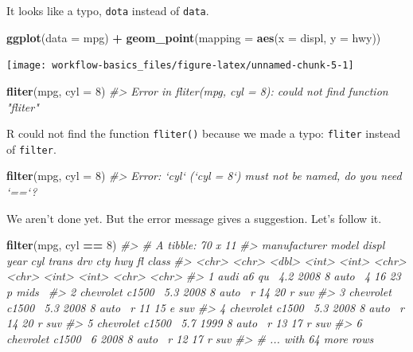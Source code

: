 \documentclass[]{book}
\newenvironment{Shaded}{\begin{snugshade}}{\end{snugshade}}
\newcommand{\CommentTok}[1]{\textcolor[rgb]{0.56,0.35,0.01}{\textit{#1}}}
\newcommand{\DataTypeTok}[1]{\textcolor[rgb]{0.13,0.29,0.53}{#1}}
\newcommand{\DecValTok}[1]{\textcolor[rgb]{0.00,0.00,0.81}{#1}}
\newcommand{\KeywordTok}[1]{\textcolor[rgb]{0.13,0.29,0.53}{\textbf{#1}}}
\newcommand{\NormalTok}[1]{#1}
\newcommand{\OperatorTok}[1]{\textcolor[rgb]{0.81,0.36,0.00}{\textbf{#1}}}
\newcommand{\StringTok}[1]{\textcolor[rgb]{0.31,0.60,0.02}{#1}}
\theoremstyle{plain}
\theoremstyle{remark}
\begin{document}
It looks like a typo, \texttt{dota} instead of \texttt{data}.

\begin{Shaded}
\begin{Highlighting}[]
\KeywordTok{ggplot}\NormalTok{(}\DataTypeTok{data =}\NormalTok{ mpg) }\OperatorTok{+}
\StringTok{  }\KeywordTok{geom_point}\NormalTok{(}\DataTypeTok{mapping =} \KeywordTok{aes}\NormalTok{(}\DataTypeTok{x =}\NormalTok{ displ, }\DataTypeTok{y =}\NormalTok{ hwy))}
\end{Highlighting}
\end{Shaded}

\begin{center}\texttt{[image: workflow-basics\_files/figure-latex/unnamed-chunk-5-1]} \end{center}

\begin{Shaded}
\begin{Highlighting}[]
\KeywordTok{fliter}\NormalTok{(mpg, }\DataTypeTok{cyl =} \DecValTok{8}\NormalTok{)}
\CommentTok{#> Error in fliter(mpg, cyl = 8): could not find function "fliter"}
\end{Highlighting}
\end{Shaded}

R could not find the function \texttt{fliter()} because we made a typo: \texttt{fliter} instead of \texttt{filter}.

\begin{Shaded}
\begin{Highlighting}[]
\KeywordTok{filter}\NormalTok{(mpg, }\DataTypeTok{cyl =} \DecValTok{8}\NormalTok{)}
\CommentTok{#> Error: `cyl` (`cyl = 8`) must not be named, do you need `==`?}
\end{Highlighting}
\end{Shaded}

We aren't done yet. But the error message gives a suggestion. Let's follow it.

\begin{Shaded}
\begin{Highlighting}[]
\KeywordTok{filter}\NormalTok{(mpg, cyl }\OperatorTok{==}\StringTok{ }\DecValTok{8}\NormalTok{)}
\CommentTok{#> # A tibble: 70 x 11}
\CommentTok{#>   manufacturer model  displ  year   cyl trans drv     cty   hwy fl    class}
\CommentTok{#>   <chr>        <chr>  <dbl> <int> <int> <chr> <chr> <int> <int> <chr> <chr>}
\CommentTok{#> 1 audi         a6 qu~   4.2  2008     8 auto~ 4        16    23 p     mids~}
\CommentTok{#> 2 chevrolet    c1500~   5.3  2008     8 auto~ r        14    20 r     suv  }
\CommentTok{#> 3 chevrolet    c1500~   5.3  2008     8 auto~ r        11    15 e     suv  }
\CommentTok{#> 4 chevrolet    c1500~   5.3  2008     8 auto~ r        14    20 r     suv  }
\CommentTok{#> 5 chevrolet    c1500~   5.7  1999     8 auto~ r        13    17 r     suv  }
\CommentTok{#> 6 chevrolet    c1500~   6    2008     8 auto~ r        12    17 r     suv  }
\CommentTok{#> # ... with 64 more rows}
\end{Highlighting}
\end{Shaded}
\end{document}
